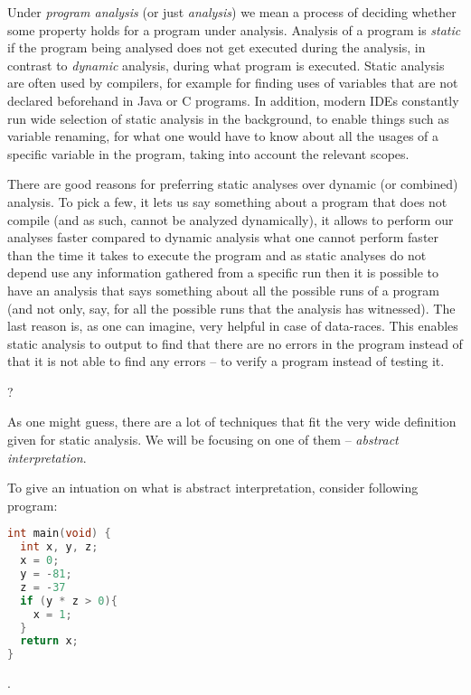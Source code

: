 \documentclass[..thesis.tex]{subfiles}
\begin{document}


Under \textit{program analysis} (or just \textit{analysis}) we mean a process of deciding whether some property holds for a program under analysis.
Analysis of a program is \textit{static} if the program being analysed does not get executed during the analysis, in contrast to \textit{dynamic} analysis,
during what program is executed. Static analysis are often used by compilers, for example for finding uses of variables that are not declared beforehand
in Java or C programs. In addition, modern IDEs constantly run wide selection of static analysis in the background, to enable things such as variable renaming,
for what one would have to know about all the usages of a specific variable in the program, taking into account the relevant scopes. 



There are good reasons for preferring static analyses over dynamic (or combined) analysis.
To pick a few, it lets us say something about a program that does not compile (and as such, cannot be analyzed dynamically),
it allows to perform our analyses faster compared to dynamic analysis what one cannot perform faster than the time it takes to execute the program
and as static analyses do not depend use any information gathered from a specific run then it is possible to have an analysis that says something
about all the possible runs of a program (and not only, say, for all the possible runs that the analysis has witnessed).
The last reason is, as one can imagine, very helpful in case of data-races. This enables static analysis to output to find that there
 are no errors in the program instead of that it is not able to find any errors -- to verify a program instead of testing it.

?


As one might guess, there are a lot of techniques that fit the very wide definition given for static analysis. We will be focusing on one of them -- \textit{abstract interpretation}.



To give an intuation on what is abstract interpretation, consider following program:

\begin{lstlisting}[language=C,style=def]
int main(void) {
  int x, y, z;
  x = 0;
  y = -81;
  z = -37
  if (y * z > 0){
    x = 1;
  }
  return x;
}
\end{lstlisting}.
\end{document}
